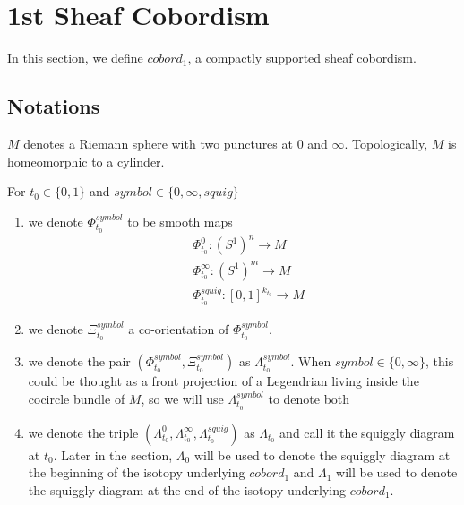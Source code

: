 \section{1st Sheaf Cobordism}
In this section, we define $cobord_1$, a compactly supported sheaf 	cobordism.
\subsection{Notations}
\begin{definition}
$M$ denotes a Riemann sphere with two punctures at $0$ and $\infty$. Topologically, $M$ is homeomorphic to a cylinder.
\end{definition}
\begin{definition}
For $t_0\in\{0,1\}$ and $symbol\in\{0,\infty, squig \}$
\begin{enumerate}
\item we denote $\Phi_{t_0}^{symbol}$ to be smooth maps
\begin{align*}
&\Phi_{t_0}^0 : (S^1)^n \rightarrow M \\
&\Phi_{t_0}^\infty : (S^1)^m \rightarrow M \\
&\Phi_{t_0}^{squig} : [0,1]^{k_{t_0}} \rightarrow M
\end{align*}

\item we denote $\Xi_{t_0}^{symbol}$ a co-orientation of $\Phi_{t_0}^{symbol}$.

\item we denote the pair $(\Phi_{t_0}^{symbol},\Xi_{t_0}^{symbol})$ as $\Lambda_{t_0}^{symbol}$. When $symbol \in \{0,\infty\}$, this could be thought as a front projection of a Legendrian living inside the cocircle bundle of $M$, so we will use $\Lambda_{t_0}^{symbol}$ to denote both

\item we denote the triple $(\Lambda_{t_0}^{0},\Lambda_{t_0}^{\infty},\Lambda_{t_0}^{squig})$ as $\Lambda_{t_0}$ and call it the squiggly diagram at $t_0$. Later in the section, $\Lambda_0$ will be used to denote the squiggly diagram at the beginning of the isotopy underlying $cobord_1$ and $\Lambda_1$ will be used to denote the squiggly diagram at the end of the isotopy underlying $cobord_1$. 
\end{enumerate}
\end{definition}

